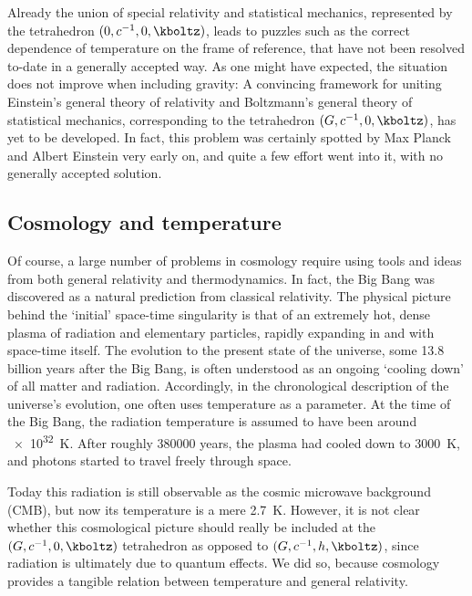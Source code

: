 \documentclass{scrartcl}
\begin{document}

\newpage {}
\label{sec:1101}

Already the union of special relativity and statistical mechanics, represented by the tetrahedron $(0,c^{-1},0,\kboltz)$, leads to puzzles such as the correct dependence of temperature on the frame of reference, that have not been resolved to-date in a generally accepted way. As one might have expected, the situation does not improve when including gravity: A convincing framework for uniting Einstein's general theory of relativity and Boltzmann's general theory of statistical mechanics, corresponding to the tetrahedron $(G,c^{-1},0,\kboltz)$, has yet to be developed. In fact, this problem was certainly spotted by Max Planck and Albert Einstein very early on, and quite a few effort went into it, with no generally accepted solution.


\subsection*{Cosmology and temperature}

Of course, a large number of problems in cosmology require using tools and ideas from both general relativity and thermodynamics. In fact, the Big Bang was discovered as a natural prediction from classical relativity. The physical picture behind the \enquote*{initial} space-time singularity is that of an extremely hot, dense plasma of radiation and elementary particles, rapidly expanding in and with space-time itself. The evolution to the present state of the universe, some \num{13.8} billion years after the Big Bang, is often understood as an ongoing \enquote*{cooling down} of all matter and radiation. Accordingly, in the chronological description of the universe's evolution, one often uses temperature as a parameter. At the time of the Big Bang, the radiation temperature is assumed to have been around \qty{e32}{\kelvin}. After roughly \num{380000} years, the plasma had cooled down to \qty{3000}{\kelvin}, and photons started to travel freely through space.

Today this radiation is still observable as the cosmic microwave background (CMB), but now its temperature is a mere \qty{2.7}{\kelvin}. However, it is not clear whether this cosmological picture should really be included at the $(G,c^{-1},0,\kboltz)$ tetrahedron as opposed to $(G,c^{-1},h,\kboltz)$, since radiation is ultimately due to quantum effects. We did so, because cosmology provides a tangible relation between temperature and general relativity.
\end{document}
